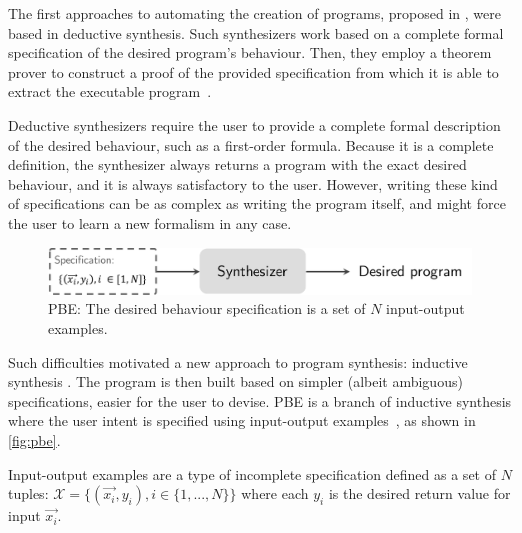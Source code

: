 The first approaches to automating the creation of programs, proposed in \citeyear{DBLP:conf/ijcai/Green69} \cite{DBLP:conf/ijcai/Green69,DBLP:conf/ijcai/WaldingerL69}, were based in deductive synthesis.
Such synthesizers work based on a complete formal specification of the desired program's behaviour.
Then, they employ a theorem prover to construct a proof of the provided specification from which it is able to extract the executable program~\cite{DBLP:conf/ijcai/Green69,DBLP:journals/cacm/MannaW71,DBLP:journals/toplas/MannaW80,DBLP:conf/ijcai/WaldingerL69}.

Deductive synthesizers require the user to provide a complete formal description of the desired behaviour, such as a first-order formula.
Because it is a complete definition, the synthesizer always returns a program with the exact desired behaviour, and it is always satisfactory to the user.
However, writing these kind of specifications can be as complex as writing the program itself, and might force the user to learn a new formalism in any case.

\begin{figure}
    \centering
    \includegraphics[scale=.35]{pictures/pbe.pdf}
    \caption{\ac{PBE}: The desired behaviour specification is a set of \(N\) input-output examples.}
    \label{fig:pbe}
\end{figure}

Such difficulties motivated a new approach to program synthesis: inductive synthesis \cite{DBLP:conf/pldi/FengMBD18,DBLP:conf/pldi/FengMGDC17,DBLP:conf/ijcai/ShawWG75,DBLP:journals/jacm/Summers77}. The program is then built based on simpler (albeit ambiguous) specifications, easier for the user to devise. \acf{PBE} is a branch of inductive synthesis where the user intent is specified using input-output examples~\cite{DBLP:conf/pldi/GodefroidT12,DBLP:conf/ijcai/ShawWG75,DBLP:journals/jacm/Summers77,DBLP:conf/sigmod/WangCB17,DBLP:conf/pldi/WangCB17}, as shown in \autoref{fig:pbe}.

\begin{definition}
Input-output examples are a type of incomplete specification defined as a set of \(N\) tuples:  \(\mathcal{X} = \{(\vec{x_i}, y_i), i \in \{1, ..., N\}\}\) where each \(y_i\) is the desired return value for input \(\vec{x_i}\).
\end{definition}

